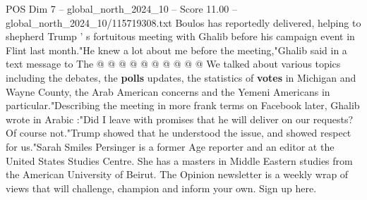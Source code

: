 \begin{textsample}{POS Dim 7 – global\_north\_2024\_10 – Score 11.00 – global\_north\_2024\_10/115719308.txt}
Boulos has reportedly delivered, helping to shepherd Trump ' s fortuitous meeting with Ghalib before his campaign event in Flint last month."He knew a lot about me before the meeting,"Ghalib said in a text message to The @ @ @ @ @ @ @ @ @ @ We talked about various topics including the debates, the \textbf{polls} updates, the statistics of \textbf{votes} in Michigan and Wayne County, the Arab American concerns and the Yemeni Americans in particular."Describing the meeting in more frank terms on Facebook later, Ghalib wrote in Arabic :"Did I leave with promises that he will deliver on our requests?
Of course not."Trump showed that he understood the issue, and showed respect for us."Sarah Smiles Persinger is a former Age reporter and an editor at the United States Studies Centre.
She has a masters in Middle Eastern studies from the American University of Beirut.
The Opinion newsletter is a weekly wrap of views that will challenge, champion and inform your own.
Sign up here.

\end{textsample}
